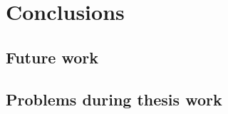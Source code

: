 \section{Conclusions}
\label{sec:conclusion}

\subsection{Future work}
\subsection{Problems during thesis work}

